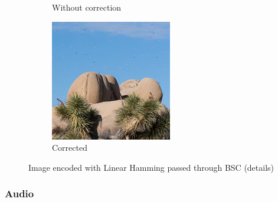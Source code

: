 \documentclass{article}
\begin{document}
\begin{figure}
\begin{subfigure}[b]{0.32\textwidth}
        \caption{Without correction}
        \label{fig:cropped-image-linear-bsc-no-correction}
    \end{subfigure}
    \hfill
    \begin{subfigure}[b]{0.32\textwidth}
        \centering
        \includegraphics[width=\textwidth]{../Result/cropped-linear-bsc-output-syndrome-corrected.png}
        \caption{Corrected}
        \label{fig:cropped-image-linear-bsc-syndrome-corrected}
    \end{subfigure}
       \caption{Image encoded with Linear Hamming passed through BSC (details)}
       \label{fig:cropped-image-linear-bsc}
\end{figure}


\subsubsection{Audio}
\end{document}
